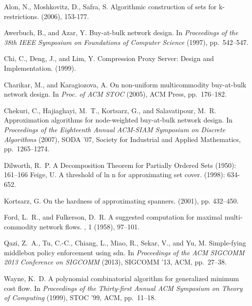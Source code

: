 \begin{thebibliography}{1}

{\sc Alon, N., Moshkovitz, D., Safra, S.}
\newblock Algorithmic construction of sets for k-restrictions.
 (2006), 153-177.

{\sc Awerbuch, B., and Azar, Y.}
\newblock Buy-at-bulk network design.
\newblock In {\em Proceedings of the 38th IEEE Symposium on Foundations of
  Computer Science\/} (1997), pp.~542--547.

{\sc Chi, C., Deng, J., and Lim, Y.}
\newblock Compression Proxy Server: Design and Implementation.
 (1999).

{\sc Charikar, M., and Karagiozova, A.}
\newblock On non-uniform multicommodity buy-at-bulk network design.
\newblock In {\em Proc. of ACM STOC\/} (2005), ACM Press, pp.~176--182.

{\sc Chekuri, C., Hajiaghayi, M.~T., Kortsarz, G., and Salavatipour, M.~R.}
\newblock Approximation algorithms for node-weighted buy-at-bulk network
  design.
\newblock In {\em Proceedings of the Eighteenth Annual ACM-SIAM Symposium on
  Discrete Algorithms\/} (2007), SODA '07, Society for Industrial and Applied
  Mathematics, pp.~1265--1274.

{\sc Dilworth, R.~P.}
\newblock A Decomposition Theorem for Partially Ordered Sets
 (1950): 161–166
{\sc Feige, U.}
\newblock A threshold of ln n for approximating set cover.
 (1998): 634-652.

{\sc Kortsarz, G.}
\newblock On the hardness of approximating spanners.
 (2001), pp. 432–450.

{\sc Ford, L.~R., and Fulkerson, D.~R.}
\newblock A suggested computation for maximal multi-commodity network flows.
, 1 (1958), 97--101.

{\sc Qazi, Z.~A., Tu, C.-C., Chiang, L., Miao, R., Sekar, V., and Yu, M.}
\newblock Simple-fying middlebox policy enforcement using sdn.
\newblock In {\em Proceedings of the ACM SIGCOMM 2013 Conference on SIGCOMM\/}
  (2013), SIGCOMM '13, ACM, pp.~27--38.

{\sc Wayne, K.~D.}
\newblock A polynomial combinatorial algorithm for generalized minimum cost
  flow.
\newblock In {\em Proceedings of the Thirty-first Annual ACM Symposium on
  Theory of Computing\/} (1999), STOC '99, ACM, pp.~11--18.

\end{thebibliography}
